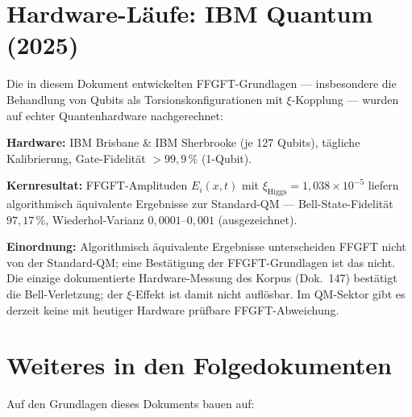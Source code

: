 \section{Hardware-Läufe: IBM Quantum (2025)}
\label{sec:ibm-validation}

\begin{keyresult}
Die in diesem Dokument entwickelten FFGFT-Grundlagen ---
insbesondere die Behandlung von Qubits als Torsionskonfigurationen
mit $\xi$-Kopplung --- wurden auf echter Quantenhardware nachgerechnet:

\textbf{Hardware:} IBM Brisbane \& IBM Sherbrooke (je 127 Qubits),
tägliche Kalibrierung, Gate-Fidelität $> 99{,}9\,\%$ (1-Qubit).

\textbf{Kernresultat:}
FFGFT-Amplituden $E_i(x,t)$ mit $\xi_\text{Higgs} = 1{,}038 \times 10^{-5}$
liefern algorithmisch äquivalente Ergebnisse zur Standard-QM ---
Bell-State-Fidelität $97{,}17\,\%$, Wiederhol-Varianz
$0{,}0001$--$0{,}001$ (ausgezeichnet).

\textbf{Einordnung:}
Algorithmisch äquivalente Ergebnisse unterscheiden FFGFT nicht von der
Standard-QM; eine Bestätigung der FFGFT-Grundlagen ist das nicht.
Die einzige dokumentierte Hardware-Messung des Korpus (Dok.~147)
bestätigt die Bell-Verletzung; der $\xi$-Effekt ist damit nicht auflösbar.
Im QM-Sektor gibt es derzeit keine mit heutiger Hardware prüfbare
FFGFT-Abweichung.
\end{keyresult}

\section{Weiteres in den Folgedokumenten}
\label{sec:folgedokumente}

Auf den Grundlagen dieses Dokuments bauen auf:

